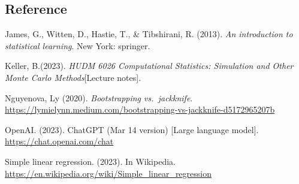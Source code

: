 \documentclass[
]{article}
\begin{document}
\hypertarget{reference}{%
\subsection{Reference}\label{reference}}

James, G., Witten, D., Hastie, T., \& Tibshirani, R. (2013). \emph{An
introduction to statistical learning}. New York: springer.

Keller, B.(2023). \emph{HUDM 6026 Computational Statistics: Simulation
and Other Monte Carlo Methods}{[}Lecture notes{]}.

Nguyenova, Ly (2020). \emph{Bootstrapping vs.~jackknife}.
\url{https://lymielynn.medium.com/bootstrapping-vs-jackknife-d5172965207b}

OpenAI. (2023). ChatGPT (Mar 14 version) {[}Large language model{]}.
\url{https://chat.openai.com/chat}

Simple linear regression. (2023). In Wikipedia.
\url{https://en.wikipedia.org/wiki/Simple_linear_regression}
\end{document}
